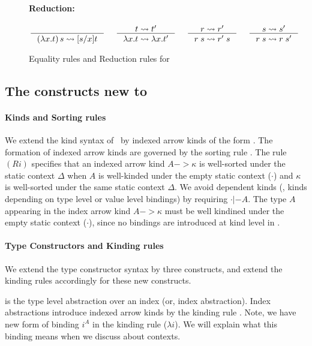 \begin{figure}
\begin{framed}
\paragraph{Reduction:} 
\[ \inference{}{(\lambda x.t)\,s \rightsquigarrow [s/x]t}
 ~~~~
   \inference{t \rightsquigarrow t'}{\lambda x.t \rightsquigarrow \lambda x.t'}
 ~~~~
   \inference{r \rightsquigarrow r'}{r\;s \rightsquigarrow r'\;s}
 ~~~~
   \inference{s \rightsquigarrow s'}{r\;s \rightsquigarrow r\;s'}
\]
\end{framed}
\caption{Equality rules and Reduction rules for \Fi}
\label{fig:eqFi}
\end{figure}

\subsection{The constructs new to \Fi}
\paragraph{Kinds and Sorting rules}
We extend the kind syntax of \Fw\ by indexed arrow kinds of the form
. The formation of indexed arrow kinds are
governed by the sorting rule .
The rule $(Ri)$ specifies that an indexed arrow kind $A -> \kappa$
is well-sorted under the static context $\Delta$
when $A$ is well-kinded under the empty static context ($\cdot$) 
and $\kappa$ is well-sorted under the same static context $\Delta$.
We avoid dependent kinds (\ie, kinds depending on type level or
value level bindings) by requiring $\cdot |- A$. The type $A$ appearing
in the index arrow kind $A -> \kappa$ must be well kindined under
the empty static context ($\cdot$), since no bindings are introduced
at kind level in \Fi.

\paragraph{Type Constructors and Kinding rules}
We extend the type constructor syntax by three constructs,
and extend the kinding rules accordingly for these new constructs.

 is the type level abstraction over an index
(or, index abstraction). Index abstractions introduce indexed arrow kinds
by the kinding rule . Note, we have new form of binding
$i^A$ in the kinding rule ($\lambda i$).
We will explain what this binding means when we discuss about contexts.

